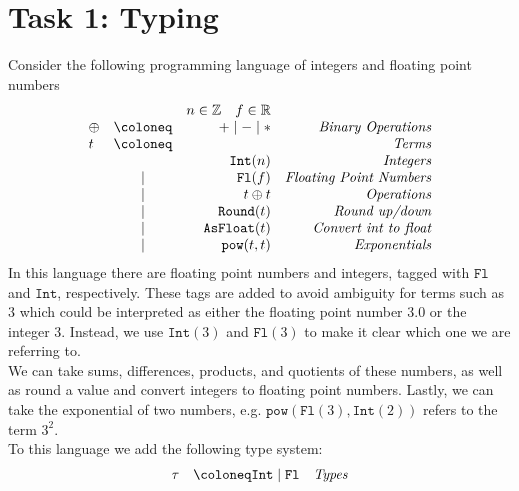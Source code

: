 \section*{Task 1: Typing}
Consider the following programming language of integers and floating point numbers 
\[
  \begin{array}{lcrr}
    & & n\in\mathbb{Z} \quad f\in\mathbb{R}\\
    \oplus & \coloneq & + \mid - \mid *  &\emph{Binary Operations}\\
    t & \coloneq & & \emph{Terms} \\
    & & \mathtt{Int}(n) & \emph{Integers}\\ 
    & \mid & \mathtt{Fl}(f) & \emph{Floating Point Numbers} \\
    & \mid & t \oplus t & \emph{Operations}\\
    & \mid & \mathtt{Round}(t) & \emph{Round up/down}\\
    & \mid & \mathtt{AsFloat}(t) & \emph{Convert int to float}\\
    & \mid & \mathtt{pow}(t,t) & \emph{Exponentials}
  \end{array}
\]
In this language there are floating point numbers and integers, tagged with $\mathtt{Fl}$ and $\mathtt{Int}$, respectively.
These tags are added to avoid ambiguity for terms such as $3$ which could be interpreted as either the floating point number $3.0$ or the integer $3$. 
Instead, we use $\mathtt{Int}(3)$ and $\mathtt{Fl}(3)$ to make it clear which one we are referring to.\\
We can take sums, differences, products, and quotients of these numbers, as well as round a value and convert integers to floating point numbers.
Lastly, we can take the exponential of two numbers, e.g. $\mathtt{pow}(\mathtt{Fl}(3),\mathtt{Int}(2))$ refers to the term $3^2$.\\
To this language we add the following type system:
\[
  \begin{array}{lcrr}
    \tau & \coloneq \mathtt{Int} \mid \mathtt{Fl} & \emph{Types}
  \end{array}
\]
